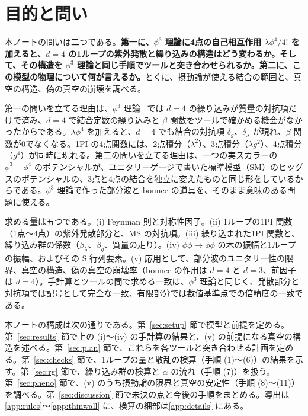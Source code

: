 \documentclass[a4paper,10pt]{ltjsarticle}
\begin{document}
\tableofcontents

\section{目的と問い}\label{sec:intro}

本ノートの問いは二つである。\textbf{第一に、$\phi^3$ 理論に4点の自己相互作用 $\lambda\phi^4/4!$ を加えると、$d=4$ の1ループの紫外発散と繰り込みの構造はどう変わるか。そして、その構造を $\phi^3$ 理論と同じ手順でツールと突き合わせられるか。第二に、この模型の物理について何が言えるか。}とくに、摂動論が使える結合の範囲と、真空の構造、偽の真空の崩壊を調べる。

第一の問いを立てる理由は、$\phi^3$ 理論~\cite{phi3note} では $d=4$ の繰り込みが質量の対抗項だけで済み、$d=4$ で結合定数の繰り込みと $\beta$ 関数をツールで確かめる機会がなかったからである。$\lambda\phi^4$ を加えると、$d=4$ でも結合の対抗項 $\delta_g$、$\delta_\lambda$ が現れ、$\beta$ 関数が0でなくなる。1PI の4点関数には、2点積分（$\lambda^2$）、3点積分（$\lambda g^2$）、4点積分（$g^4$）が同時に現れる。第二の問いを立てる理由は、一つの実スカラーの $\phi^3+\phi^4$ のポテンシャルが、ユニタリーゲージで書いた標準模型（SM）のヒッグスのポテンシャルの、3点と4点の結合を独立に変えたものと同じ形をしているからである。$\phi^3$ 理論で作った部分波と bounce の道具を、そのまま意味のある問題に使える。

求める量は五つである。(i) Feynman 則と対称性因子。(ii) 1ループの1PI 関数（1点〜4点）の紫外発散部分と、$\overline{\mathrm{MS}}$ の対抗項。(iii) 繰り込まれた1PI 関数と、繰り込み群の係数（$\beta_\lambda$、$\beta_g$、質量の走り）。(iv) $\phi\phi\to\phi\phi$ の木の振幅と1ループの振幅、およびその S 行列要素。(v) 応用として、部分波のユニタリー性の限界、真空の構造、偽の真空の崩壊率（bounce の作用は $d=4$ と $d=3$、前因子は $d=4$）。手計算とツールの間で求める一致は、$\phi^3$ 理論と同じく、発散部分と対抗項では記号として完全な一致、有限部分では数値基準点での倍精度の一致である。

本ノートの構成は次の通りである。第~\ref{sec:setup} 節で模型と前提を定める。第~\ref{sec:results} 節で上の (i)〜(iv) の手計算の結果と、(v) の前提になる真空の構造を述べる。第~\ref{sec:plan} 節で、これらを各ツールと突き合わせる計画を定める。第~\ref{sec:checks} 節で、1ループの量と散乱の検算（手順 (1)〜(6)）の結果を示す。第~\ref{sec:rg} 節で、繰り込み群の検算と $\alpha$ の流れ（手順 (7)）を扱う。第~\ref{sec:pheno} 節で、(v) のうち摂動論の限界と真空の安定性（手順 (8)〜(11)）を調べる。第~\ref{sec:discussion} 節で未決の点と今後の手順をまとめる。導出は\ref{app:rules}〜\ref{app:thinwall} に、検算の細部は\ref{app:details} にある。
\end{document}
